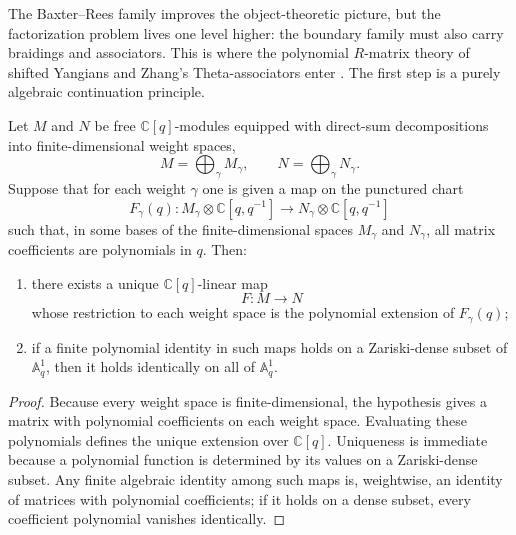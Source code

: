 The Baxter--Rees family improves the object-theoretic picture, but the
factorization problem lives one level higher: the boundary family must
also carry braidings and associators. This is where the polynomial
$R$-matrix theory of shifted Yangians and Zhang's Theta-associators enter
\cite{HZ24,ZhangTheta24}. The first step is a purely algebraic
continuation principle.

\begin{lemma}
\ClaimStatusProvedHere
\label{lem:weightwise-polynomial-continuation}
Let $M$ and $N$ be free $\mathbb C[q]$-modules equipped with direct-sum
decompositions into finite-dimensional weight spaces,
\begin{equation}
M=\bigoplus_{\gamma} M_\gamma,
\qquad N=\bigoplus_{\gamma} N_\gamma.
\end{equation}
Suppose that for each weight $\gamma$ one is given a map on the punctured
chart
\begin{equation}
F_\gamma(q):M_\gamma\otimes \mathbb C[q,q^{-1}]
\longrightarrow N_\gamma\otimes \mathbb C[q,q^{-1}]
\end{equation}
such that, in some bases of the finite-dimensional spaces $M_\gamma$ and
$N_\gamma$, all matrix coefficients are polynomials in $q$. Then:
\begin{enumerate}
 \item there exists a unique $\mathbb C[q]$-linear map
 \begin{equation}
 F:M\to N
 \end{equation}
 whose restriction to each weight space is the polynomial extension of
 $F_\gamma(q)$;
 \item if a finite polynomial identity in such maps holds on a
 Zariski-dense subset of $\mathbb A^1_q$, then it holds identically on
 all of $\mathbb A^1_q$.
\end{enumerate}
\end{lemma}

\begin{proof}
Because every weight space is finite-dimensional, the hypothesis gives a
matrix with polynomial coefficients on each weight space. Evaluating
these polynomials defines the unique extension over $\mathbb C[q]$.
Uniqueness is immediate because a polynomial function is determined by its
values on a Zariski-dense subset. Any finite algebraic identity among
such maps is, weightwise, an identity of matrices with polynomial
coefficients; if it holds on a dense subset, every coefficient polynomial
vanishes identically.
\end{proof}


